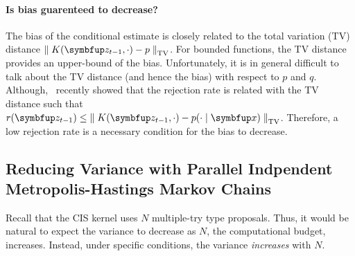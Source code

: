 \paragraph{Is bias guarenteed to decrease?}
The bias of the conditional estimate is closely related to the total variation (TV) distance \(\DTV{K(\vz_{t-1}, \cdot)}{p}\).
For bounded functions, the TV distance provides an upper-bound of the bias.
Unfortunately, it is in general difficult to talk about the TV distance (and hence the bias) with respect to \(p\) and \(q\).
Although,~\citet{wang_exact_2020} recently showed that the rejection rate is related with the TV distance such that \(r(\vz_{t-1}) \leq \DTV{K(\vz_{t-1}, \cdot)}{p(\cdot\mid\vx)}\).
Therefore, a low rejection rate is a necessary condition for the bias to decrease.



\subsection{Reducing Variance with Parallel Indpendent Metropolis-Hastings Markov Chains}\label{section:cis_bias}
Recall that the CIS kernel uses \(N\) multiple-try type proposals.
Thus, it would be natural to expect the variance to decrease as \(N\), the computational budget, increases.
Instead, under specific conditions, the variance \textit{increases} with \(N\).


